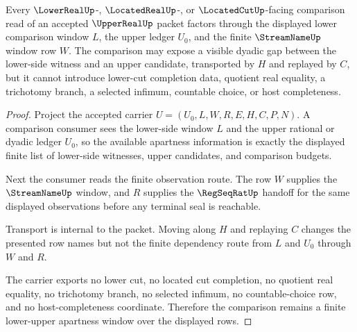 \begin{theorem}
\label{thm:upper-real-lower-upper-apartness-window}
Every $\LowerRealUp$-, $\LocatedRealUp$-, or $\LocatedCutUp$-facing comparison read of an accepted $\UpperRealUp$ packet factors through the displayed lower comparison window $L$, the upper ledger $U_0$, and the finite $\StreamNameUp$ window row $W$. The comparison may expose a visible dyadic gap between the lower-side witness and an upper candidate, transported by $H$ and replayed by $C$, but it cannot introduce lower-cut completion data, quotient real equality, a trichotomy branch, a selected infimum, countable choice, or host completeness.
\end{theorem}
\begin{proof}
Project the accepted carrier $U=(U_0,L,W,R,E,H,C,P,N)$. A comparison consumer sees the lower-side window $L$ and the upper rational or dyadic ledger $U_0$, so the available apartness information is exactly the displayed finite list of lower-side witnesses, upper candidates, and comparison budgets.

Next the consumer reads the finite observation route. The row $W$ supplies the $\StreamNameUp$ window, and $R$ supplies the $\RegSeqRatUp$ handoff for the same displayed observations before any terminal seal is reachable.

Transport is internal to the packet. Moving along $H$ and replaying $C$ changes the presented row names but not the finite dependency route from $L$ and $U_0$ through $W$ and $R$.

The carrier exports no lower cut, no located cut completion, no quotient real equality, no trichotomy branch, no selected infimum, no countable-choice row, and no host-completeness coordinate. Therefore the comparison remains a finite lower-upper apartness window over the displayed rows.
\end{proof}

